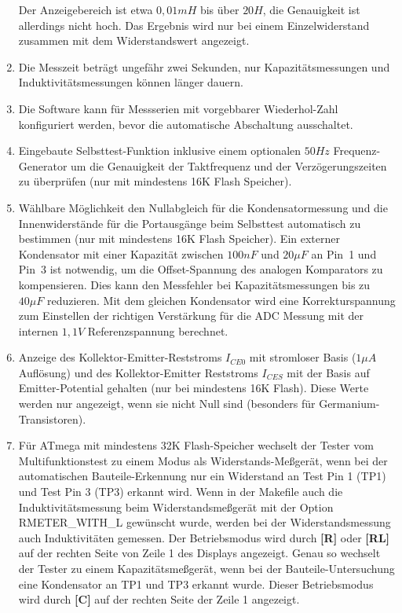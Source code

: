\begin{enumerate}
Der Anzeigebereich ist etwa \(0,01mH\) bis über \(20H\), die Genauigkeit ist allerdings nicht hoch.
Das Ergebnis wird nur bei einem Einzelwiderstand zusammen mit dem Widerstandswert angezeigt.
\item Die Messzeit beträgt ungefähr zwei Sekunden, nur Kapazitätsmessungen und Induktivitätsmessungen können länger dauern.
\item Die Software kann für Messserien mit vorgebbarer Wiederhol-Zahl konfiguriert werden, bevor die automatische Abschaltung ausschaltet.
\item Eingebaute Selbsttest-Funktion inklusive einem optionalen \(50Hz\) Frequenz-Generator um die Genauigkeit der Taktfrequenz
und der Verzögerungszeiten zu überprüfen (nur mit mindestens 16K Flash Speicher).
\item Wählbare Möglichkeit den Nullabgleich für die Kondensatormessung und die Innenwiderstände für die
Portausgänge beim Selbsttest automatisch zu bestimmen (nur mit mindestens 16K Flash Speicher).
Ein externer Kondensator mit einer Kapazität zwischen \(100nF\) und \(20\mu F\) an Pin~1 und Pin~3 ist notwendig, 
um die Offset-Spannung des analogen Komparators zu kompensieren.
Dies kann den Messfehler bei Kapazitätsmessungen bis zu \(40\mu F\) reduzieren.
Mit dem gleichen Kondensator wird eine Korrekturspannung zum Einstellen der richtigen Verstärkung für
die ADC Messung mit der internen \(1,1V\) Referenzspannung berechnet.
\item Anzeige des Kollektor-Emitter-Reststroms \(I_{CE0}\) mit stromloser Basis (\(1\mu A\) Auflösung) und
des Kollektor-Emitter Reststroms \(I_{CES}\) mit der Basis auf Emitter-Potential gehalten (nur bei mindestens 16K Flash).
Diese Werte werden nur angezeigt, wenn sie nicht Null sind (besonders für Germanium-Transistoren).
\item Für ATmega mit mindestens 32K Flash-Speicher wechselt der Tester vom Multifunktionstest zu einem Modus als
Widerstands-Meßgerät, wenn bei der automatischen Bauteile-Erkennung nur ein Widerstand an Test Pin 1 (TP1) und
Test Pin 3 (TP3) erkannt wird. Wenn in der Makefile auch die Induktivitätsmessung beim Widerstandsmeßgerät
mit der Option RMETER\_WITH\_L gewünscht wurde, werden bei der Widerstandsmessung auch Induktivitäten gemessen.
Der Betriebsmodus wird durch {\bf[R]} oder {\bf[RL]} auf der rechten Seite von Zeile 1 des Displays angezeigt.
Genau so wechselt der Tester zu einem Kapazitätsmeßgerät, wenn bei der Bauteile-Untersuchung
eine Kondensator an TP1 und TP3 erkannt wurde. Dieser Betriebsmodus wird durch {\bf[C]} auf der rechten Seite der Zeile 1 angezeigt.

\end{enumerate}

